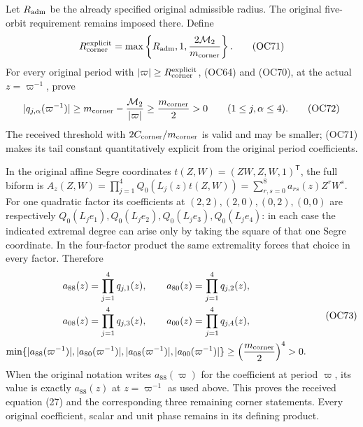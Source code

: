 Let $R_{\rm adm}$ be the already specified original admissible radius.
The original five-orbit requirement remains imposed there. Define
\[
 R_{\rm corner}^{\rm explicit}
   =\max\left\{R_{\rm adm},1,
                      \frac{2\mathcal M_2}{m_{\rm corner}}\right\}.
 \tag{OC71}\label{hzoc:eq:OC71}
\]
For every original period with $|\varpi|\ge
R_{\rm corner}^{\rm explicit}$, (OC64) and (OC70), at the actual
$z=\varpi^{-1}$, prove
\[
 |q_{j,\alpha}(\varpi^{-1})|
 \ge m_{\rm corner}-\frac{\mathcal M_2}{|\varpi|}
 \ge\frac{m_{\rm corner}}2>0
            \qquad(1\le j,\alpha\le4).
 \tag{OC72}\label{hzoc:eq:OC72}
\]
The received threshold with $2C_{\rm corner}/m_{\rm corner}$ is
valid and may be smaller; (OC71) makes its tail constant quantitatively
explicit from the original period coefficients.

In the original affine Segre coordinates $t(Z,W)=(ZW,Z,W,1)^{\mathsf T}$,
the full biform is
$A_z(Z,W)=\prod_{j=1}^4Q_0(L_j(z)t(Z,W))
 =\sum_{r,s=0}^8a_{rs}(z)Z^rW^s$.
For one quadratic factor its coefficients at $(2,2),(2,0),(0,2),(0,0)$
are respectively $Q_0(L_je_1),Q_0(L_je_2),Q_0(L_je_3),Q_0(L_je_4)$:
in each case the indicated extremal degree can arise only by taking the
square of that one Segre coordinate. In the four-factor product the
same extremality forces that choice in every factor. Therefore
\[
 \begin{gathered}
 a_{88}(z)=\prod_{j=1}^4q_{j,1}(z),\qquad
 a_{80}(z)=\prod_{j=1}^4q_{j,2}(z),\\
 a_{08}(z)=\prod_{j=1}^4q_{j,3}(z),\qquad
 a_{00}(z)=\prod_{j=1}^4q_{j,4}(z),\\
 \min\{|a_{88}(\varpi^{-1})|,|a_{80}(\varpi^{-1})|,
          |a_{08}(\varpi^{-1})|,|a_{00}(\varpi^{-1})|\}
       \ge\left(\frac{m_{\rm corner}}2\right)^4>0.
 \end{gathered}\tag{OC73}\label{hzoc:eq:OC73}
\]
When the original notation writes $a_{88}(\varpi)$ for the coefficient
at period $\varpi$, its value is exactly $a_{88}(z)$ at
$z=\varpi^{-1}$ as used above. This proves the received equation (27)
and the corresponding three remaining corner statements. Every original
coefficient, scalar and unit phase remains in its defining product.

